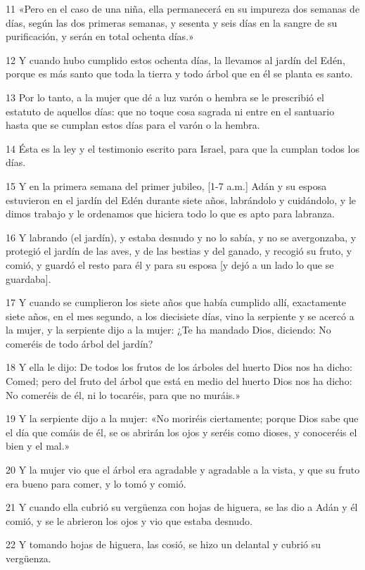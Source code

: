 \par 11 «Pero en el caso de una niña, ella permanecerá en su impureza dos semanas de días, según las dos primeras semanas, y sesenta y seis días en la sangre de su purificación, y serán en total ochenta días.»
\par 12 Y cuando hubo cumplido estos ochenta días, la llevamos al jardín del Edén, porque es más santo que toda la tierra y todo árbol que en él se planta es santo.
\par 13 Por lo tanto, a la mujer que dé a luz varón o hembra se le prescribió el estatuto de aquellos días: que no toque cosa sagrada ni entre en el santuario hasta que se cumplan estos días para el varón o la hembra.
\par 14 Ésta es la ley y el testimonio escrito para Israel, para que la cumplan todos los días.
\par 15 Y en la primera semana del primer jubileo, [1-7 a.m.] Adán y su esposa estuvieron en el jardín del Edén durante siete años, labrándolo y cuidándolo, y le dimos trabajo y le ordenamos que hiciera todo lo que es apto para labranza.
\par 16 Y labrando (el jardín), y estaba desnudo y no lo sabía, y no se avergonzaba, y protegió el jardín de las aves, y de las bestias y del ganado, y recogió su fruto, y comió, y guardó el resto para él y para su esposa [y dejó a un lado lo que se guardaba].
\par 17 Y cuando se cumplieron los siete años que había cumplido allí, exactamente siete años, en el mes segundo, a los diecisiete días, vino la serpiente y se acercó a la mujer, y la serpiente dijo a la mujer: ¿Te ha mandado Dios, diciendo: No comeréis de todo árbol del jardín?
\par 18 Y ella le dijo: De todos los frutos de los árboles del huerto Dios nos ha dicho: Comed; pero del fruto del árbol que está en medio del huerto Dios nos ha dicho: No comeréis de él, ni lo tocaréis, para que no muráis.»
\par 19 Y la serpiente dijo a la mujer: «No moriréis ciertamente; porque Dios sabe que el día que comáis de él, se os abrirán los ojos y seréis como dioses, y conoceréis el bien y el mal.»
\par 20 Y la mujer vio que el árbol era agradable y agradable a la vista, y que su fruto era bueno para comer, y lo tomó y comió.
\par 21 Y cuando ella cubrió su vergüenza con hojas de higuera, se las dio a Adán y él comió, y se le abrieron los ojos y vio que estaba desnudo.
\par 22 Y tomando hojas de higuera, las cosió, se hizo un delantal y cubrió su vergüenza.
